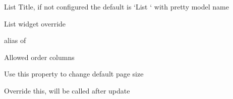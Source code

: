 \documentclass[letterpaper,10pt,english]{sphinxmanual}
\begin{document}
\begin{fulllineitems}
\begin{fulllineitems}
\end{fulllineitems}


\begin{fulllineitems}
\label{api:flask.ext.appbuilder.baseviews.BaseCRUDView.list_title}
List Title, if not configured the default is `List ` with pretty model name

\end{fulllineitems}


\begin{fulllineitems}
\label{api:flask.ext.appbuilder.baseviews.BaseCRUDView.list_widget}
List widget override

alias of 

\end{fulllineitems}


\begin{fulllineitems}
\label{api:flask.ext.appbuilder.baseviews.BaseCRUDView.order_columns}
Allowed order columns

\end{fulllineitems}


\begin{fulllineitems}
\label{api:flask.ext.appbuilder.baseviews.BaseCRUDView.page_size}
Use this property to change default page size

\end{fulllineitems}


\begin{fulllineitems}
\label{api:flask.ext.appbuilder.baseviews.BaseCRUDView.post_add}
Override this, will be called after update

\end{fulllineitems}


\end{fulllineitems}
\end{document}
